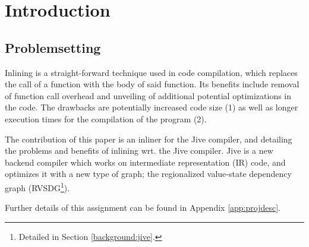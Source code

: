 
\section{Introduction}

\subsection{Problemsetting}


Inlining is a straight-forward technique used in code compilation, which
replaces the call of a function with the body of said function. Its benefits
include removal of function call overhead and unveiling of additional potential
optimizations in the code. The drawbacks are potentially increased code size (1)
as well as longer execution times for the compilation of the program (2).

The contribution of this paper is an inliner for the Jive
compiler, and detailing the problems and benefits of inlining wrt. the Jive
compiler. Jive is a new backend compiler which works on intermediate
representation (IR) code, and optimizes it with a new type of graph; the
regionalized value-state dependency graph (RVSDG\footnote{Detailed in Section
\ref{background:jive}.}).

Further details of this assignment can be found in Appendix
\ref{app:projdesc}.
